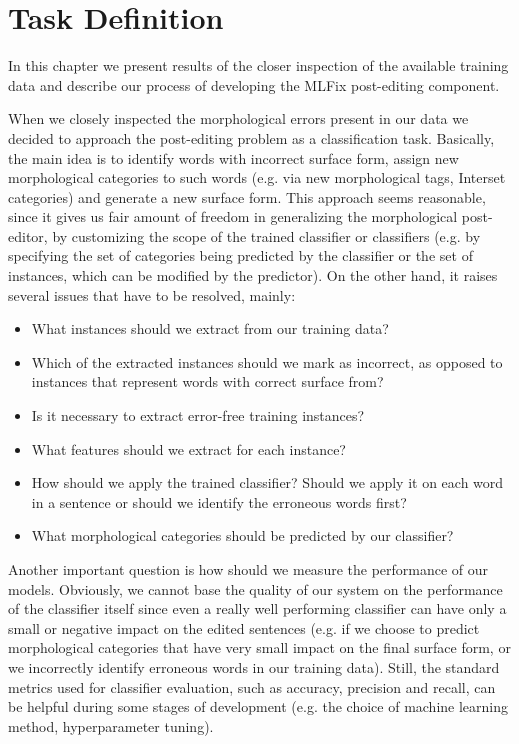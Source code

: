 \chapter{Task Definition}
\label{chap:task_descr}

In this chapter we present results of the closer inspection
of the available training data and describe our process of developing
the MLFix post-editing component.


When we closely inspected the morphological errors present in our data we decided
to approach the post-editing problem as a classification task. 
Basically, the main idea is to identify words with incorrect surface form,
assign new morphological categories to such words (e.g. via new morphological tags, Interset
categories) and generate a new surface form.
This approach seems reasonable, since it gives us fair amount of freedom in generalizing the morphological
post-editor, by customizing the scope of the trained classifier or classifiers (e.g. by specifying the
set of categories being predicted by the classifier or the set of instances, which can be modified by the predictor).
On the other hand, it raises several issues that have to be resolved, mainly:
\begin{itemize}
    \item What instances should we extract from our training data?
    \item Which of the extracted instances should we mark as incorrect, as opposed
        to instances that represent words with correct surface from?
    \item Is it necessary to extract error-free training instances?
    \item What features should we extract for each instance?
    \item How should we apply the trained classifier? Should we apply it
        on each word in a sentence or should we identify the erroneous words
        first?
    \item What morphological categories should be predicted by our classifier?
\end{itemize}

Another important question is how should we measure the performance of our models.
Obviously, we cannot base the quality of our system on the performance of the
classifier itself since even a really well performing classifier can have only a small or negative
impact on the edited sentences (e.g. if we choose to predict morphological categories
that have very small impact on the final surface form, or we incorrectly identify erroneous words
in our training data). Still, the standard metrics
used for classifier evaluation, such as accuracy, precision and recall, can be helpful
during some stages of development (e.g. the choice of machine learning method, hyperparameter tuning).

